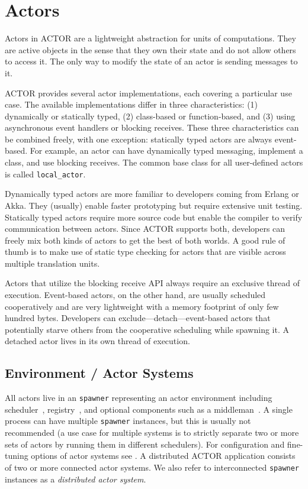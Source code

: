 \section{Actors}
\label{actor}

Actors in ACTOR are a lightweight abstraction for units of computations. They
are active objects in the sense that they own their state and do not allow
others to access it. The only way to modify the state of an actor is sending
messages to it.

ACTOR provides several actor implementations, each covering a particular use
case. The available implementations differ in three characteristics: (1)
dynamically or statically typed, (2) class-based or function-based, and (3)
using asynchronous event handlers or blocking receives. These three
characteristics can be combined freely, with one exception: statically typed
actors are always event-based. For example, an actor can have dynamically typed
messaging, implement a class, and use blocking receives. The common base class
for all user-defined actors is called \lstinline^local_actor^.

Dynamically typed actors are more familiar to developers coming from Erlang or
Akka. They (usually) enable faster prototyping but require extensive unit
testing. Statically typed actors require more source code but enable the
compiler to verify communication between actors. Since ACTOR supports both,
developers can freely mix both kinds of actors to get the best of both worlds.
A good rule of thumb is to make use of static type checking for actors that are
visible across multiple translation units.

Actors that utilize the blocking receive API always require an exclusive thread
of execution. Event-based actors, on the other hand, are usually scheduled
cooperatively and are very lightweight with a memory footprint of only few
hundred bytes. Developers can exclude---detach---event-based actors that
potentially starve others from the cooperative scheduling while spawning it. A
detached actor lives in its own thread of execution.

\subsection{Environment / Actor Systems}
\label{actor-system}

All actors live in an \lstinline^spawner^ representing an actor
environment including scheduler~, registry~, and
optional components such as a middleman~. A single process can
have multiple \lstinline^spawner^ instances, but this is usually not
recommended (a use case for multiple systems is to strictly separate two or
more sets of actors by running them in different schedulers). For configuration
and fine-tuning options of actor systems see . A
distributed ACTOR application consists of two or more connected actor systems. We
also refer to interconnected \lstinline^spawner^ instances as a
\emph{distributed actor system}.

